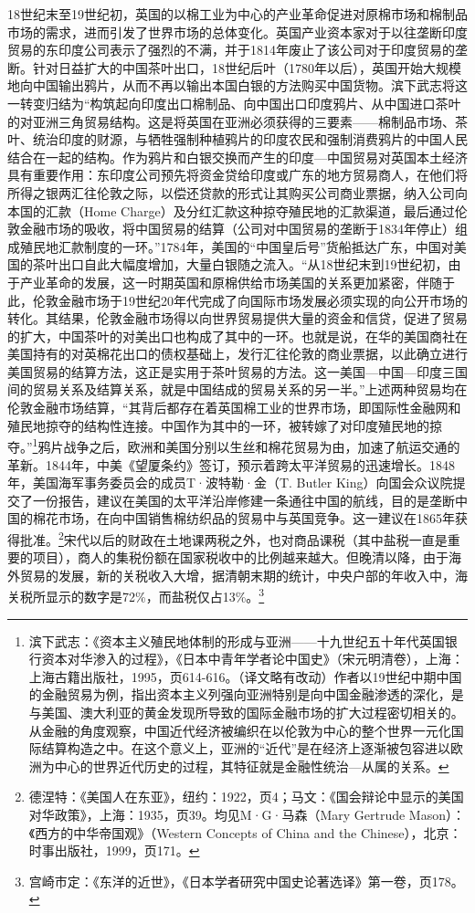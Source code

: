 \documentclass[a4paper, 12pt, openright]{ctexbook}
\begin{document}
18世纪末至19世纪初，英国的以棉工业为中心的产业革命促进对原棉市场和棉制品市场的需求，进而引发了世界市场的总体变化。英国产业资本家对于以往垄断印度贸易的东印度公司表示了强烈的不满，并于1814年废止了该公司对于印度贸易的垄断。针对日益扩大的中国茶叶出口，18世纪后叶（1780年以后），英国开始大规模地向中国输出鸦片，从而不再以输出本国白银的方法购买中国货物。滨下武志将这一转变归结为“构筑起向印度出口棉制品、向中国出口印度鸦片、从中国进口茶叶的对亚洲三角贸易结构。这是将英国在亚洲必须获得的三要素——棉制品市场、茶叶、统治印度的财源，与牺牲强制种植鸦片的印度农民和强制消费鸦片的中国人民结合在一起的结构。作为鸦片和白银交换而产生的印度—中国贸易对英国本土经济具有重要作用：东印度公司预先将资金贷给印度或广东的地方贸易商人，在他们将所得之银两汇往伦敦之际，以偿还贷款的形式让其购买公司商业票据，纳入公司向本国的汇款（Home Charge）及分红汇款这种掠夺殖民地的汇款渠道，最后通过伦敦金融市场的吸收，将中国贸易的结算（公司对中国贸易的垄断于1834年停止）组成殖民地汇款制度的一环。”1784年，美国的“中国皇后号”货船抵达广东，中国对美国的茶叶出口自此大幅度增加，大量白银随之流入。“从18世纪末到19世纪初，由于产业革命的发展，这一时期英国和原棉供给市场美国的关系更加紧密，伴随于此，伦敦金融市场于19世纪20年代完成了向国际市场发展必须实现的向公开市场的转化。其结果，伦敦金融市场得以向世界贸易提供大量的资金和信贷，促进了贸易的扩大，中国茶叶的对美出口也构成了其中的一环。也就是说，在华的美国商社在美国持有的对英棉花出口的债权基础上，发行汇往伦敦的商业票据，以此确立进行美国贸易的结算方法，这正是实用于茶叶贸易的方法。这一美国—中国—印度三国间的贸易关系及结算关系，就是中国结成的贸易关系的另一半。”上述两种贸易均在伦敦金融市场结算，“其背后都存在着英国棉工业的世界市场，即国际性金融网和殖民地掠夺的结构性连接。中国作为其中的一环，被转嫁了对印度殖民地的掠夺。”\footnote{滨下武志：《资本主义殖民地体制的形成与亚洲——十九世纪五十年代英国银行资本对华渗入的过程》，《日本中青年学者论中国史》（宋元明清卷），上海：上海古籍出版社，1995，页614-616。（译文略有改动）作者以19世纪中期中国的金融贸易为例，指出资本主义列强向亚洲特别是向中国金融渗透的深化，是与美国、澳大利亚的黄金发现所导致的国际金融市场的扩大过程密切相关的。从金融的角度观察，中国近代经济被编织在以伦敦为中心的整个世界一元化国际结算构造之中。在这个意义上，亚洲的“近代”是在经济上逐渐被包容进以欧洲为中心的世界近代历史的过程，其特征就是金融性统治—从属的关系。}鸦片战争之后，欧洲和美国分别以生丝和棉花贸易为由，加速了航运交通的革新。1844年，中美《望厦条约》签订，预示着跨太平洋贸易的迅速增长。1848年，美国海军事务委员会的成员T·波特勒·金（T. Butler King）向国会众议院提交了一份报告，建议在美国的太平洋沿岸修建一条通往中国的航线，目的是垄断中国的棉花市场，在向中国销售棉纺织品的贸易中与英国竞争。这一建议在1865年获得批准。\footnote{德涅特：《美国人在东亚》，纽约：1922，页4；马文：《国会辩论中显示的美国对华政策》，上海：1935，页39。均见M·G·马森（Mary Gertrude Mason）：《西方的中华帝国观》（Western Concepts of China and the Chinese），北京：时事出版社，1999，页171。}宋代以后的财政在土地课两税之外，也对商品课税（其中盐税一直是重要的项目），商人的集税份额在国家税收中的比例越来越大。但晚清以降，由于海外贸易的发展，新的关税收入大增，据清朝末期的统计，中央户部的年收入中，海关税所显示的数字是72\%，而盐税仅占13\%。\footnote{宫崎市定：《东洋的近世》，《日本学者研究中国史论著选译》第一卷，页178。}
\end{document}
